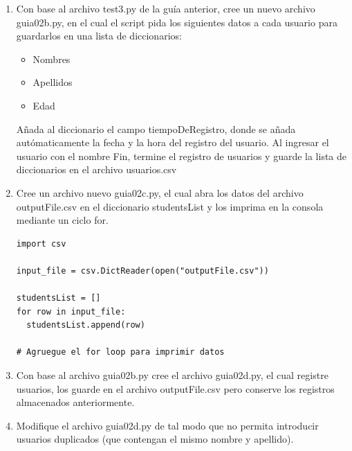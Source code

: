 \documentclass[10pt,letterpaper]{article}
\begin{document}
\begin{enumerate}
\item Con base al archivo test3.py de la guía anterior, cree un nuevo archivo guia02b.py, en el cual el script pida los siguientes datos a cada usuario para guardarlos en una lista de diccionarios: 
\begin{itemize}
\item Nombres
\item Apellidos
\item Edad
\end{itemize}

Añada al diccionario el campo tiempoDeRegistro, donde se añada autómaticamente la fecha y la hora del registro del usuario. Al ingresar el usuario con el nombre Fin, termine el registro de usuarios y guarde la lista de diccionarios en el archivo usuarios.csv


\item Cree un archivo nuevo guia02c.py, el cual abra los datos del archivo outputFile.csv en el diccionario studentsList y los imprima en la consola mediante un ciclo for.
\begin{verbatim}
import csv

input_file = csv.DictReader(open("outputFile.csv"))

studentsList = []
for row in input_file:
  studentsList.append(row)

# Agruegue el for loop para imprimir datos  
\end{verbatim}

\item Con base al archivo guia02b.py cree el archivo guia02d.py, el cual registre usuarios, los guarde en el archivo outputFile.csv pero conserve los registros almacenados anteriormente. 

\item Modifique el archivo guia02d.py de tal modo que no permita introducir usuarios duplicados (que contengan el mismo nombre y apellido).






\end{enumerate}
\end{document}
